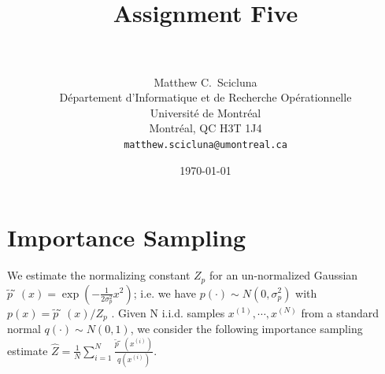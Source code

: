 \documentclass[paper=a4, fontsize=11pt]{scrartcl} %
\title{	
\normalfont \normalsize 
\horrule{0.5pt} \\[0.4cm] %
\huge Assignment Five \\ %
\horrule{2pt} \\[0.5cm] %
}
\author{
	Matthew C.~Scicluna\\
	D\'epartement d'Informatique et de Recherche Op\'erationnelle\\
	Universit\'e de Montr\'eal\\
	Montr\'eal, QC H3T 1J4 \\
	\texttt{matthew.scicluna@umontreal.ca}
}
\date{\normalsize\today} %
\numberwithin{equation}{section} %
\numberwithin{figure}{section} %
\numberwithin{table}{section} %
\begin{document}
\maketitle %


\section{Importance Sampling}
We estimate the normalizing constant $Z_p$ for an un-normalized Gaussian
$\tilde{p}̃(x) = \exp\left(-\frac{1}{2\sigma_p^2} x^2\right)$; i.e. we have $p(\cdot)\sim N(0,\sigma_p^2)$ with $p(x) = \tilde{p}̃(x)/Z_p$ . Given N i.i.d. samples $x^{(1)} , \cdots , x^{(N)}$ from a standard normal $q(\cdot) \sim N (0, 1)$, we consider the following importance sampling estimate $\hat{Z} = \frac{1}{N}\sum_{i=1}^N \frac{\tilde{p}̃(x^{(i)})}{q(x^{(i)})}$. 
\end{document}
